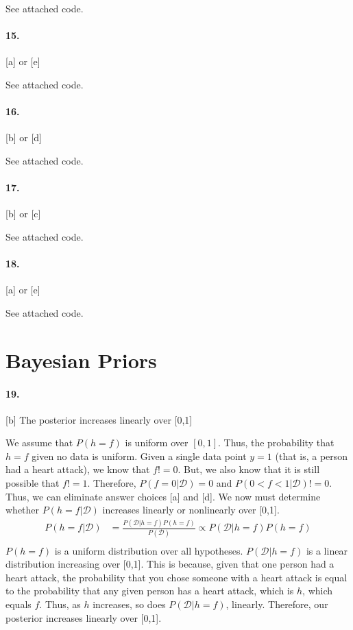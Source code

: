 \documentclass[titlepage]{article}
\begin{document}
	See attached code.

\paragraph{15.} [a] or [e]

	See attached code.

\paragraph{16.} [b] or [d]

	See attached code.

\paragraph{17.} [b] or [c]

	See attached code.

\paragraph{18.} [a] or [e]

	See attached code.


\section*{Bayesian Priors}
\paragraph{19.} [b] The posterior increases linearly over [0,1]

	We assume that $P(h=f)$ is uniform over $[0,1]$. Thus, the probability that $h=f$ given no data is uniform. Given a single data point $y = 1$ (that is, a person had a heart attack), we know that $f != 0$. But, we also know that it is still possible that $f != 1$. Therefore, $P(f = 0 | \mathcal D) = 0$ and $P(0 < f < 1 | \mathcal D) != 0$. Thus, we can eliminate answer choices [a] and [d]. We now must determine whether $P(h = f | \mathcal D)$ increases linearly or nonlinearly over [0,1].
	\begin{align*}
	P(h=f | \mathcal D) &= \frac{P(\mathcal D | h=f) P (h=f)}{P(\mathcal D)} \propto P(\mathcal D | h=f) P (h=f) \\
	\end{align*}
	$P (h=f)$ is a uniform distribution over all hypotheses. $P(\mathcal D | h=f)$ is a linear distribution increasing over [0,1]. This is because, given that one person had a heart attack, the probability that you chose someone with a heart attack is equal to the probability that any given person has a heart attack, which is $h$, which equals $f$. Thus, as $h$ increases, so does $P(\mathcal D | h=f)$, linearly. Therefore, our posterior increases linearly over [0,1].
\end{document}
